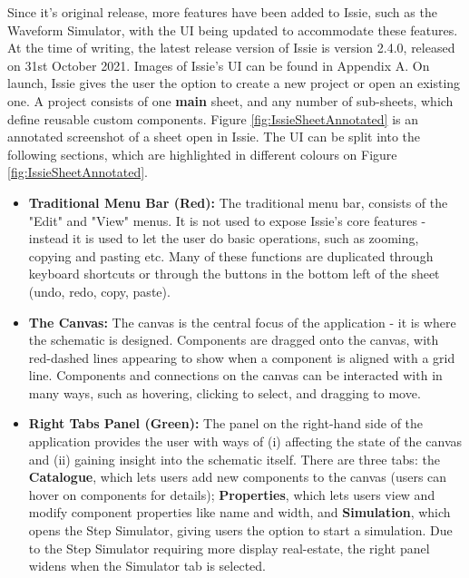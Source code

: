 Since it's original release, more features have been added to Issie, such as the Waveform Simulator, with the UI being updated to accommodate these features. At the time of writing, the latest release version of Issie is version 2.4.0, released on 31st October 2021. Images of Issie's UI can be found in Appendix A. On launch, Issie gives the user the option to create a new project or open an existing one. A project consists of one \textbf{main} sheet, and any number of sub-sheets, which define reusable custom components. Figure \ref{fig:IssieSheetAnnotated} is an annotated screenshot of a sheet open in Issie. The UI can be split into the following sections, which are highlighted in different colours on Figure \ref{fig:IssieSheetAnnotated}.

\begin{itemize}
    \item[] \textbf{Traditional Menu Bar (Red):} The traditional menu bar, consists of the "Edit" and "View" menus. It is not used to expose Issie's core features - instead it is used to let the user do basic operations, such as zooming, copying and pasting etc. Many of these functions are duplicated through keyboard shortcuts or through the buttons in the bottom left of the sheet (undo, redo, copy, paste).
    \item[] \textbf{The Canvas:} The canvas is the central focus of the application - it is where the schematic is designed. Components are dragged onto the canvas, with red-dashed lines appearing to show when a component is aligned with a grid line. Components and connections on the canvas can be interacted with in many ways, such as hovering, clicking to select, and dragging to move.
    \item[] \textbf{Right Tabs Panel (Green):} The panel on the right-hand side of the application provides the user with ways of (i) affecting the state of the canvas and (ii) gaining insight into the schematic itself. There are three tabs: the \textbf{Catalogue}, which lets users add new components to the canvas (users can hover on components for details); \textbf{Properties}, which lets users view and modify component properties like name and width, and \textbf{Simulation}, which opens the Step Simulator, giving users the option to start a simulation. Due to the Step Simulator requiring more display real-estate, the right panel widens when the Simulator tab is selected.

\end{itemize}
